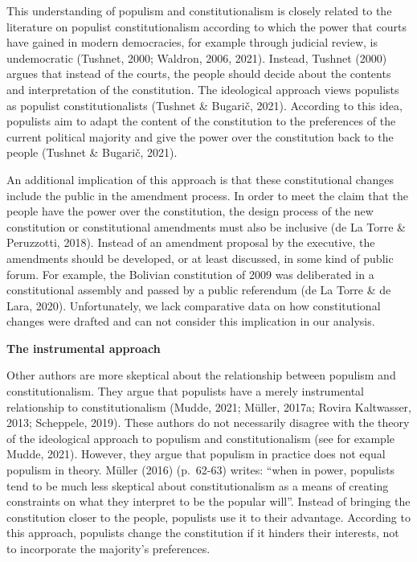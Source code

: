 \documentclass[
  abstract]{article}
\begin{document}
This understanding of populism and constitutionalism is closely related
to the literature on populist constitutionalism according to which the
power that courts have gained in modern democracies, for example through
judicial review, is undemocratic (Tushnet, 2000; Waldron, 2006, 2021).
Instead, Tushnet (2000) argues that instead of the courts, the people
should decide about the contents and interpretation of the constitution.
The ideological approach views populists as populist constitutionalists
(Tushnet \& Bugarič, 2021). According to this idea, populists aim to
adapt the content of the constitution to the preferences of the current
political majority and give the power over the constitution back to the
people (Tushnet \& Bugarič, 2021).

An additional implication of this approach is that these constitutional
changes include the public in the amendment process. In order to meet
the claim that the people have the power over the constitution, the
design process of the new constitution or constitutional amendments must
also be inclusive (de La Torre \& Peruzzotti, 2018). Instead of an
amendment proposal by the executive, the amendments should be developed,
or at least discussed, in some kind of public forum. For example, the
Bolivian constitution of 2009 was deliberated in a constitutional
assembly and passed by a public referendum (de La Torre \& de Lara,
2020). Unfortunately, we lack comparative data on how constitutional
changes were drafted and can not consider this implication in our
analysis.

\textbf{The instrumental approach}

Other authors are more skeptical about the relationship between populism
and constitutionalism. They argue that populists have a merely
instrumental relationship to constitutionalism (Mudde, 2021; Müller,
2017a; Rovira Kaltwasser, 2013; Scheppele, 2019). These authors do not
necessarily disagree with the theory of the ideological approach to
populism and constitutionalism (see for example Mudde, 2021). However,
they argue that populism in practice does not equal populism in theory.
Müller (2016) (p.~62-63) writes: ``when in power, populists tend to be
much less skeptical about constitutionalism as a means of creating
constraints on what they interpret to be the popular will''. Instead of
bringing the constitution closer to the people, populists use it to
their advantage. According to this approach, populists change the
constitution if it hinders their interests, not to incorporate the
majority's preferences.
\end{document}
